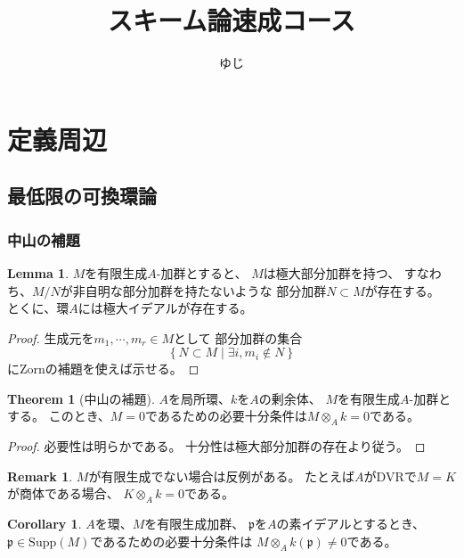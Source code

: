 \documentclass[uplatex]{jsarticle}
\title{スキーム論速成コース}
\author{ゆじ}
\theoremstyle{definition}
\newtheorem{thm}{Theorem}[section]
\newtheorem{cor}[cor]{Corollary}
\newtheorem{lem}[lem]{Lemma}
\newtheorem{rem}[rem]{Remark}
\newcommand{\Supp}{\mathrm{Supp}}
\newcommand{\mfp}{\mathfrak{p}}
\begin{document}
\maketitle



\section{定義周辺}


\subsection{最低限の可換環論}


\subsubsection{中山の補題}




\begin{lem}
  \(M\)を有限生成\(A\)-加群とすると、
  \(M\)は極大部分加群を持つ、
  すなわち、\(M/N\)が非自明な部分加群を持たないような
  部分加群\(N\subset M\)が存在する。
  とくに、環\(A\)には極大イデアルが存在する。
\end{lem}

\begin{proof}
  生成元を\(m_1,\cdots, m_r\in M\)として
  部分加群の集合
  \[
  \left\{ N \subset M \middle| \exists i, m_i \not\in N\right\}
  \]
  にZornの補題を使えば示せる。
\end{proof}



\begin{thm}[中山の補題]
  \(A\)を局所環、\(k\)を\(A\)の剰余体、
  \(M\)を有限生成\(A\)-加群とする。
  このとき、\(M=0\)であるための必要十分条件は\(M\otimes_A k=0\)である。
\end{thm}

\begin{proof}
  必要性は明らかである。
  十分性は極大部分加群の存在より従う。
\end{proof}


\begin{rem}
  \(M\)が有限生成でない場合は反例がある。
  たとえば\(A\)がDVRで\(M=K\)が商体である場合、
  \(K\otimes_Ak=0\)である。
\end{rem}


\begin{cor}
  \(A\)を環、\(M\)を有限生成加群、
  \(\mfp\)を\(A\)の素イデアルとするとき、
  \(\mfp \in \Supp(M)\)であるための必要十分条件は
  \(M\otimes_A k(\mfp) \neq 0\)である。
\end{cor}
\end{document}
